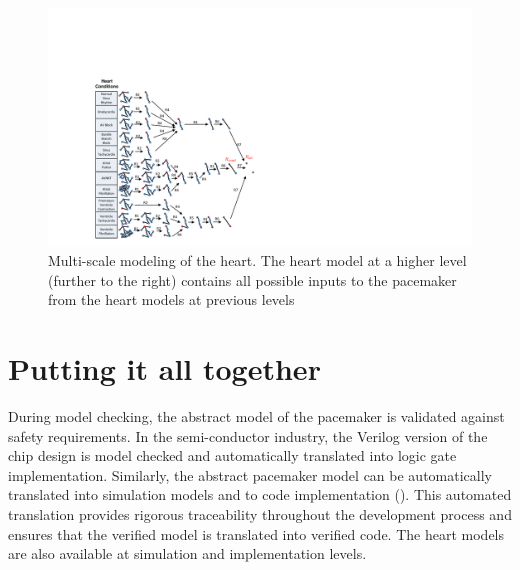 
\begin{figure}[t]
		\centering
		\includegraphics[width=\textwidth]{figs/abs_tree.pdf}
		\caption{\small Multi-scale modeling of the heart. The heart model at a higher level (further to the right) contains all possible inputs to the pacemaker from the heart models at previous levels}
		\label{fig:abs_tree}
\end{figure}

\section{Putting it all together}
During model checking, the abstract model of the pacemaker is validated against safety requirements. In the semi-conductor industry, the Verilog version of the chip design is model checked and automatically translated into logic gate implementation. 
Similarly, the abstract pacemaker model can be automatically translated into simulation models and to code implementation (). This automated translation provides rigorous traceability throughout the development process and ensures that the verified model is translated into verified code. The heart models are also available at simulation and implementation levels. 

